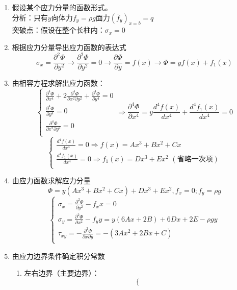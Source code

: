 \begin{remark}
	\quad
	\begin{enumerate}
		\item 假设某个应力分量的函数形式。\\
		分析：只有$y$向体力$f_y=\rho g$面力$\left( \bar{f}_y \right) _{x=b}=q$\\
		突破点：假设在整个长柱内：$\sigma _x=0$
		\item 根据应力分量导出应力函数的表达式\[\sigma _x=\frac{\partial ^2\varPhi}{\partial y^2}\rightarrow \frac{\partial ^2\varPhi}{\partial y^2}=0\rightarrow \frac{\partial \varPhi}{\partial y}=f\left( x \right) \rightarrow \varPhi =yf\left( x \right) +f_1\left( x \right) \]
		\item 由相容方程求解出应力函数：\[\begin{cases}
		\frac{\partial ^4\varPhi}{\partial x^4}+2\frac{\partial ^4\varPhi}{\partial x^2\partial y^2}+\frac{\partial ^4\varPhi}{\partial y^4}=0\\
		\frac{\partial ^4\varPhi}{\partial y^4}=0\\
		\frac{\partial ^4\varPhi}{\partial x^2\partial y^2}=0\\
		\end{cases}\Longrightarrow \frac{\partial ^4\varPhi}{\partial x^4}=y\frac{d^4f\left( x \right)}{dx^4}+\frac{d^4f_1\left( x \right)}{dx^4}=0\]
		\[\begin{cases}
		\frac{d^4f\left( x \right)}{dx^4}=0\Longrightarrow f\left( x \right) =Ax^3+Bx^2+Cx\\
		\frac{d^4f_1\left( x \right)}{dx^4}=0\Longrightarrow f_1\left( x \right) =Dx^3+Ex^2\,\, \left( \text{省略一}次\text{项} \right)\\
		\end{cases}\]
		\item 由应力函数求解应力分量\[\varPhi =y\left( Ax^3+Bx^2+Cx \right) +Dx^3+Ex^2,f_x=0;f_y=\rho g\]
		\[\begin{cases}
		\sigma _x=\frac{\partial ^2\varPhi}{\partial y^2}-f_xx=0\\
		\sigma _y=\frac{\partial ^2\varPhi}{\partial x^2}-f_yy=y\left( 6Ax+2B \right) +6Dx+2E-\rho gy\\
		\tau _{xy}=-\frac{\partial ^2\varPhi}{\partial x\partial y}=-\left( 3Ax^2+2Bx+C \right)\\
		\end{cases}\]
		\item 由应力边界条件确定积分常数
		\begin{enumerate}
			\item 左右边界（主要边界）：\[\begin{cases}

\end{cases}\]
\end{enumerate}
\end{enumerate}
\end{remark}
